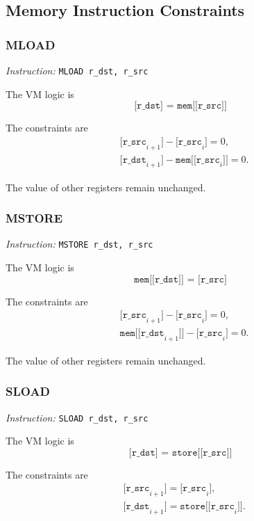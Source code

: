 \subsection{Memory Instruction Constraints}

\subsubsection{MLOAD}

\emph{Instruction:} \verb|MLOAD r_dst, r_src|

The VM logic is
\[ \texttt{[r\_dst] = mem[[r\_src]]} \]

The constraints are
\begin{align*}
    & \texttt{[r\_src}_{i+1}\texttt{]} - \texttt{[r\_src}_i\texttt{]} = 0, \\
    & \texttt{[r\_dst}_{i+1}\texttt{]} - \texttt{mem[[r\_src}_i\texttt{]]} = 0.
\end{align*}

The value of other registers remain unchanged.

\subsubsection{MSTORE}

\emph{Instruction:} \verb|MSTORE r_dst, r_src|

The VM logic is
\[ \texttt{mem[[r\_dst]] = [r\_src]} \]

The constraints are
\begin{align*}
    & \texttt{[r\_src}_{i+1}\texttt{]} - \texttt{[r\_src}_i\texttt{]} = 0, \\
    & \texttt{mem[[r\_dst}_{i+1}\texttt{]]} - \texttt{[r\_src}_i\texttt{]} = 0.
\end{align*}

The value of other registers remain unchanged.

\subsubsection{SLOAD}

\emph{Instruction:} \verb|SLOAD r_dst, r_src|

The VM logic is
\[ \texttt{[r\_dst] = store[[r\_src]]} \]

The constraints are
\begin{align*}
    & \texttt{[r\_src}_{i+1}\texttt{]} = \texttt{[r\_src}_i\texttt{]}, \\
    & \texttt{[r\_dst}_{i+1}\texttt{]} = \texttt{store[[r\_src}_i\texttt{]]}.
\end{align*}

